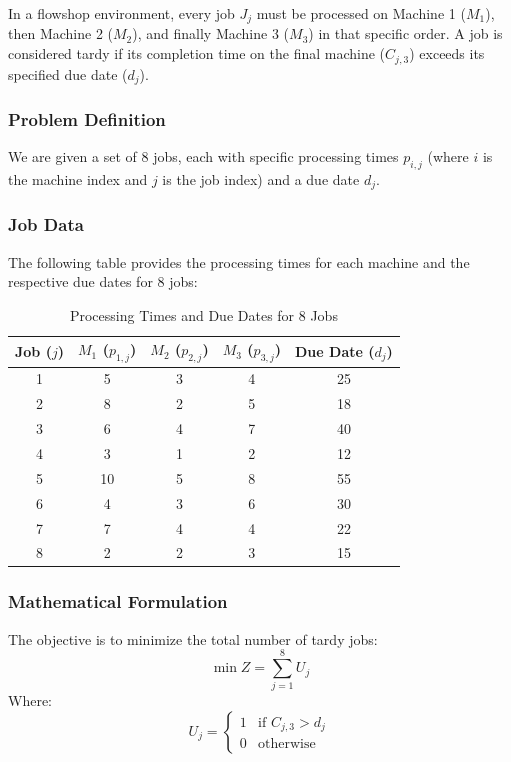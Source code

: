 \documentclass[11pt]{article}
\begin{document}
In a flowshop environment, every job $J_j$ must be processed on Machine 1 ($M_1$), then Machine 2 ($M_2$), and finally Machine 3 ($M_3$) in that specific order. A job is considered tardy if its completion time on the final machine ($C_{j,3}$) exceeds its specified due date ($d_j$).

\subsubsection{Problem Definition}
We are given a set of 8 jobs, each with specific processing times $p_{i,j}$ (where $i$ is the machine index and $j$ is the job index) and a due date $d_j$.

\subsubsection{Job Data}
The following table provides the processing times for each machine and the respective due dates for 8 jobs:

\begin{table}[h!]
\centering
\caption{Processing Times and Due Dates for 8 Jobs}
\begin{tabular}{@{}ccccc@{}}
\toprule
\textbf{Job ($j$)} & \textbf{$M_1$ ($p_{1,j}$)} & \textbf{$M_2$ ($p_{2,j}$)} & \textbf{$M_3$ ($p_{3,j}$)} & \textbf{Due Date ($d_j$)} \\ \midrule
1 & 5  & 3  & 4  & 25 \\
2 & 8  & 2  & 5  & 18 \\
3 & 6  & 4  & 7  & 40 \\
4 & 3  & 1  & 2  & 12 \\
5 & 10 & 5  & 8  & 55 \\
6 & 4  & 3  & 6  & 30 \\
7 & 7  & 4  & 4  & 22 \\
8 & 2  & 2  & 3  & 15 \\ \bottomrule
\end{tabular}
\end{table}

\subsubsection{Mathematical Formulation}
The objective is to minimize the total number of tardy jobs:
\begin{equation}
    \min Z = \sum_{j=1}^{8} U_j
\end{equation}
Where:
\begin{equation}
    U_j = 
    \begin{cases} 
      1 & \text{if } C_{j,3} > d_j \\
      0 & \text{otherwise}
    \end{cases}
\end{equation}
\end{document}
